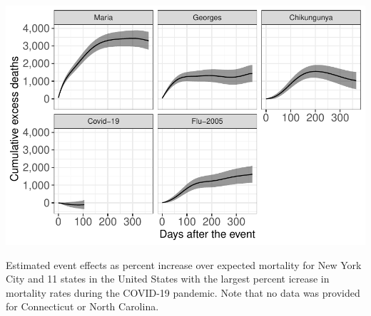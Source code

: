 \documentclass[11pt]{article}
\begin{document}
\begin{suppfigure}[ht]
	\centering
	\includegraphics[width=1\linewidth]{figs/supp-figure-5.pdf} 
	\caption{Estimated event effects as percent increase over expected mortality for New York City and 11 states in the United States with the largest percent icrease in mortality rates during the COVID-19 pandemic. Note that no data was provided for Connecticut or North Carolina.}
	\label{supp-fig:covid19-states}
\end{suppfigure}
\end{document}
